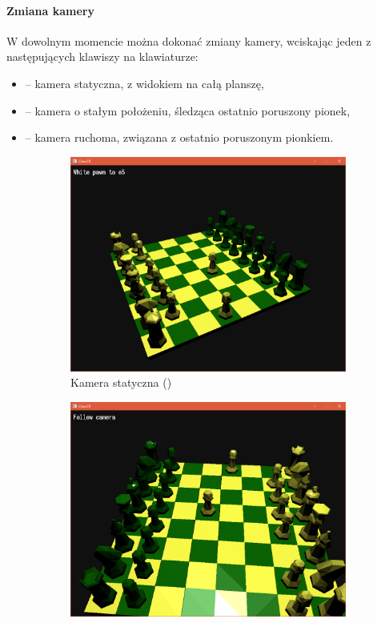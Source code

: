 \documentclass[10pt,a4paper]{article}
\begin{document}
\paragraph{Zmiana kamery}
W dowolnym momencie można dokonać zmiany kamery, wciskając jeden z następujących klawiszy na klawiaturze:
\begin{itemize}
	\item {} -- kamera statyczna, z widokiem na całą planszę,
	\item {} -- kamera o stałym położeniu, śledząca ostatnio poruszony pionek,
	\item {} -- kamera ruchoma, związana z ostatnio poruszonym pionkiem.
\end{itemize} 

\begin{figure}[H]
	\centering
	\begin{subfigure}[b]{0.3\textwidth}
		\includegraphics[width=\textwidth]{screenshots/03_static.png}
		\caption{Kamera statyczna ()}
	\end{subfigure}
	\begin{subfigure}[b]{0.3\textwidth}
		\includegraphics[width=\textwidth]{screenshots/04_follow.png}

\end{subfigure}
\end{figure}
\end{document}
